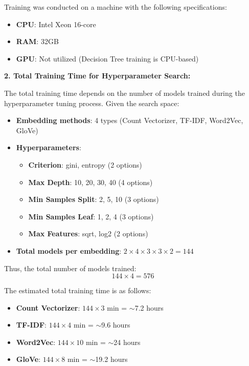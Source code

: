 Training was conducted on a machine with the following specifications:  
\begin{itemize}
    \item \textbf{CPU}: Intel Xeon 16-core  
    \item \textbf{RAM}: 32GB  
    \item \textbf{GPU}: Not utilized (Decision Tree training is CPU-based)  
\end{itemize}

\textbf{2. Total Training Time for Hyperparameter Search:}  

The total training time depends on the number of models trained during the hyperparameter tuning process. Given the search space:  

\begin{itemize}
    \item \textbf{Embedding methods}: 4 types (Count Vectorizer, TF-IDF, Word2Vec, GloVe)  
    \item \textbf{Hyperparameters}:  
    \begin{itemize}
        \item \textbf{Criterion}: gini, entropy (2 options)  
        \item \textbf{Max Depth}: 10, 20, 30, 40 (4 options)  
        \item \textbf{Min Samples Split}: 2, 5, 10 (3 options)  
        \item \textbf{Min Samples Leaf}: 1, 2, 4 (3 options)  
        \item \textbf{Max Features}: sqrt, log2 (2 options)  
    \end{itemize}
    \item \textbf{Total models per embedding}: $2 \times 4 \times 3 \times 3 \times 2 = 144$  
\end{itemize}

Thus, the total number of models trained:  
\[
144 \times 4 = 576
\]

The estimated total training time is as follows:  

\begin{itemize}
    \item \textbf{Count Vectorizer}: $144 \times 3$ min = $\sim$7.2 hours  
    \item \textbf{TF-IDF}: $144 \times 4$ min = $\sim$9.6 hours  
    \item \textbf{Word2Vec}: $144 \times 10$ min = $\sim$24 hours  
    \item \textbf{GloVe}: $144 \times 8$ min = $\sim$19.2 hours  
\end{itemize}

